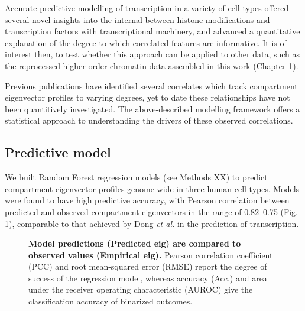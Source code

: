 \documentclass[a4paper,11pt,oneside]{book}
\begin{document}
Accurate predictive modelling of transcription in a variety of cell types offered several novel insights into the internal between histone modifications and transcription factors with transcriptional machinery, and advanced a quantitative explanation of the degree to which correlated features are informative. It is of interest then, to test whether this approach can be applied to other data, such as the reprocessed higher order chromatin data assembled in this work (Chapter 1).

Previous publications have identified several correlates which track compartment eigenvector profiles to varying degrees,\cite{Lieberman2009, Imakaev2012} yet to date these relationships have not been quantitively investigated. The above-described modelling framework offers a statistical approach to understanding the drivers of these observed correlations.

\subsection{Predictive model}

We built Random Forest regression models (see Methods XX) to predict compartment eigenvector profiles genome-wide in three human cell types. Models were found to have high predictive accuracy, with Pearson correlation between predicted and observed compartment eigenvectors in the range of 0.82--0.75 (Fig. \ref{fig:modelres}), comparable to that achieved by Dong \emph{et al.}\cite{Dong2012} in the prediction of transcription.

\begin{figure}
\begin{center} 
\captionsetup{width=\textwidth} 
\caption{ {\bf Model predictions (Predicted eig) are compared to observed values (Empirical eig).}  Pearson correlation coefficient (PCC) and root mean-squared error (RMSE) report the degree of success of the regression model, whereas accuracy (Acc.) and area under the receiver operating characteristic (AUROC) give the classification accuracy of binarized outcomes.
}\label{fig:modelres}
\end{center} 
\end{figure} 
\end{document}
